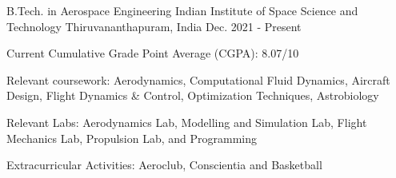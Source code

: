 

\begin{cventries}

  \cventry
  {B.Tech. in Aerospace Engineering} %
  {Indian Institute of Space Science and Technology} %
  {Thiruvananthapuram, India} %
  {Dec. 2021 - Present} %
  {
    \begin{cvitems} %
      \item {Current Cumulative Grade Point Average (CGPA): 8.07/10}
      \item {Relevant coursework: Aerodynamics, Computational Fluid Dynamics, Aircraft Design, Flight Dynamics \& Control, Optimization Techniques, Astrobiology}
      \item {Relevant Labs: Aerodynamics Lab, Modelling and Simulation Lab, Flight Mechanics Lab, Propulsion Lab, and Programming}
      \item {Extracurricular Activities: Aeroclub, Conscientia and Basketball}
    \end{cvitems}
  }



\end{cventries}
